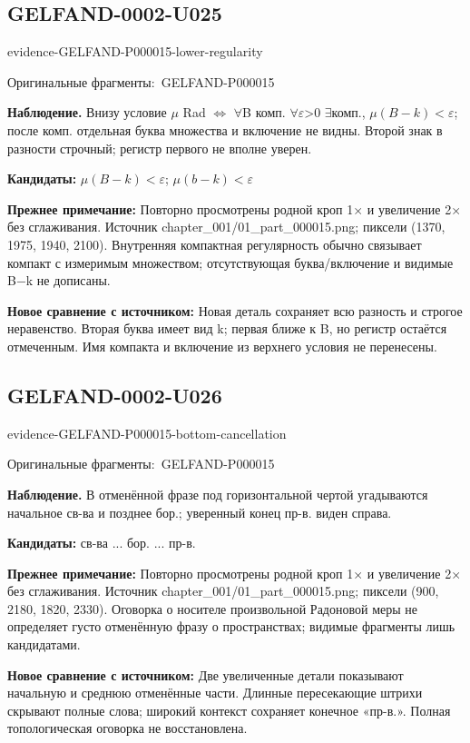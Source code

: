 \documentclass[11pt]{article}
\newcommand{\EvidenceBlock}[4]{%
 \par\smallskip\noindent\begin{minipage}{\linewidth}
 \begin{minipage}[t]{.47\linewidth}\vspace{0pt}\centering
 \csname evidence-#1-#2\endcsname\par
 {\scriptsize\SourceCropCaption\ #1}\par
 \end{minipage}\hfill
 \begin{minipage}[t]{.49\linewidth}\vspace{0pt}\raggedright
 {\small\color{orange!65!black}\textbf{#4} #3}\par
 \end{minipage}
 \end{minipage}\par\smallskip}
\newcommand{\SourceCropCaption}{Оригинальные фрагменты:}\newcommand{\ReadingCaption}{Сомнительное чтение.}\newcommand{\IncompleteCaption}{Неразобранный фрагмент.}\newcommand{\DiagramCaption}{Рисунок и набранное описание.}
\begin{document}
\subsection*{GELFAND-0002-U025}
\EvidenceBlock{GELFAND-P000015}{lower-regularity}{Внизу условие \(\mu\) Rad \(\Longleftrightarrow\) \(\forall\)B комп. \(\forall\)\(\varepsilon\)>0 \(\exists\)комп., \(\mu(B-k)<\varepsilon\); после комп. отдельная буква множества и включение не видны. Второй знак в разности строчный; регистр первого не вполне уверен.}{Наблюдение.}
\par\smallskip\noindent\textbf{Кандидаты: } \(\mu(B-k)<\varepsilon\); \(\mu(b-k)<\varepsilon\)\par
\par\smallskip\noindent\textbf{Прежнее примечание: } Повторно просмотрены родной кроп 1× и увеличение 2× без сглаживания. Источник chapter\_001/01\_part\_000015.png; пиксели (1370, 1975, 1940, 2100). Внутренняя компактная регулярность обычно связывает компакт с измеримым множеством; отсутствующая буква/включение и видимые B−k не дописаны.\par
\par\smallskip\noindent\textbf{Новое сравнение с источником: } Новая деталь сохраняет всю разность и строгое неравенство. Вторая буква имеет вид k; первая ближе к B, но регистр остаётся отмеченным. Имя компакта и включение из верхнего условия не перенесены.\par

\subsection*{GELFAND-0002-U026}
\EvidenceBlock{GELFAND-P000015}{bottom-cancellation}{В отменённой фразе под горизонтальной чертой угадываются начальное св-ва и позднее бор.; уверенный конец пр-в. виден справа.}{Наблюдение.}
\par\smallskip\noindent\textbf{Кандидаты: } св-ва ... бор. ... пр-в.\par
\par\smallskip\noindent\textbf{Прежнее примечание: } Повторно просмотрены родной кроп 1× и увеличение 2× без сглаживания. Источник chapter\_001/01\_part\_000015.png; пиксели (900, 2180, 1820, 2330). Оговорка о носителе произвольной Радоновой меры не определяет густо отменённую фразу о пространствах; видимые фрагменты лишь кандидатами.\par
\par\smallskip\noindent\textbf{Новое сравнение с источником: } Две увеличенные детали показывают начальную и среднюю отменённые части. Длинные пересекающие штрихи скрывают полные слова; широкий контекст сохраняет конечное «пр-в.». Полная топологическая оговорка не восстановлена.\par
\end{document}
